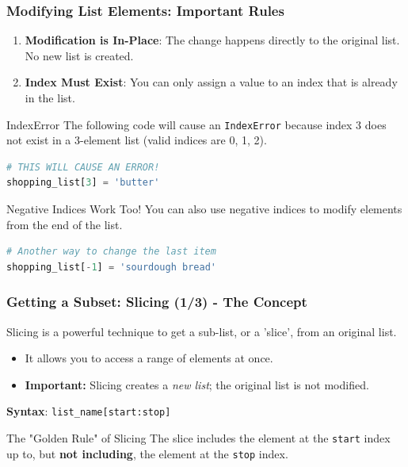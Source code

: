 \documentclass{beamer}
\begin{document}
\begin{frame}[fragile]
    \frametitle{Modifying List Elements: Important Rules}
    
    \begin{enumerate}
        \item \textbf{Modification is In-Place}: The change happens directly to the original list. No new list is created.
        
        \pause
        
        \item \textbf{Index Must Exist}: You can only assign a value to an index that is already in the list.
    \end{enumerate}
    
    \begin{alertblock}{IndexError}
        The following code will cause an \texttt{IndexError} because index 3 does not exist in a 3-element list (valid indices are 0, 1, 2).
\begin{lstlisting}[language=Python]
# THIS WILL CAUSE AN ERROR!
shopping_list[3] = 'butter'
\end{lstlisting}
    \end{alertblock}
    
    \pause
    
    \begin{block}{Negative Indices Work Too!}
        You can also use negative indices to modify elements from the end of the list.
\begin{lstlisting}[language=Python]
# Another way to change the last item
shopping_list[-1] = 'sourdough bread'
\end{lstlisting}
    \end{block}
    
\end{frame}

\begin{frame}[fragile]
    \frametitle{Getting a Subset: Slicing (1/3) - The Concept}
    
    Slicing is a powerful technique to get a sub-list, or a 'slice', from an original list.
    
    \begin{itemize}
        \item It allows you to access a range of elements at once.
        \item \textbf{Important:} Slicing creates a \textit{new list}; the original list is not modified.
    \end{itemize}
    
    \bigskip
    
    \textbf{Syntax}: \texttt{list\_name[start:stop]}
    
    \begin{alertblock}{The "Golden Rule" of Slicing}
        The slice includes the element at the \texttt{start} index up to, but \textbf{not including}, the element at the \texttt{stop} index.
    \end{alertblock}
    
\end{frame}
\end{document}

